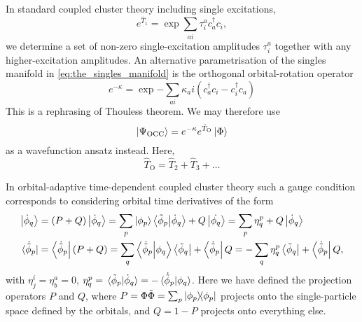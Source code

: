 \begin{tcolorbox}[title={Orbital-optimised and Bruecker coupled cluster theories
    \cite{krylov1998size,pedersen1999gauge}}, 
    colback={white},
    colbacktitle={pink},
    coltitle={black}]

    In standard coupled cluster theory including single excitations,
    \begin{equation}
        \label{eq:the_singles_manifold}
        e^{\hat{T}_1} = \exp{\sum_{ai}\tau^a_ic^\dagger_ac_i},
    \end{equation} 
    we determine a set of non-zero single-excitation amplitudes $\tau^a_i$
    together with any 
    higher-excitation amplitudes.
    An alternative parametrisation of the singles manifold
    in \autoref{eq:the_singles_manifold} is the orthogonal orbital-rotation 
    operator
    \begin{equation}
        \label{eq:the_orbital rotator}
        e^{-\kappa} = \exp{ 
            - \sum_{ai} \kappa_ai(c^\dagger_a c_i - c^\dagger_i c_a)     
        }
    \end{equation}
    This is a rephrasing of Thouless
    theorem\cite{thouless1960stability}. We may therefore use 
    \begin{equation}
       \ket{\Psi_{\text{OCC}}} = e^{-\kappa}e^{\hat{T}_{\text{O}}}\ket{\Phi}
    \end{equation}
    as a wavefunction ansatz instead. Here,
    \begin{equation}
        \hat{T}_{\text{O}} = \hat{T}_2 + \hat{T}_3 + \dots
    \end{equation}

\end{tcolorbox}

In orbital-adaptive time-dependent coupled cluster theory such a gauge condition corresponds
to considering orbital time derivatives of the form
\begin{align}
    \label{eq:orbital_time_derivative_ket}
    \ket{\dot{\phi}_q} &= (P + Q)\ket{\dot{\phi}_q}
        = \sum_p \ket{\phi_p}\braket{\tilde{\phi}_p}{\dot{\phi}_q} 
            + Q\ket{\dot{\phi_q}}
        = \sum_p\eta^p_q + Q\ket{\dot{\phi}_q}\\
    \label{eq:orbital_time_derivative_bra}
    \bra*{\dot{\tilde{\phi}}_p} &= \bra{\dot{\tilde{\phi}}_p}(P + Q)
        = \sum_q \braket{\dot{\tilde{\phi}}_p}{\phi_q}\bra{\tilde{\phi}_q}
            + \bra{\dot{\tilde{\phi}}_p}Q
        = - \sum_q \eta^p_q \bra{\tilde{\phi}_q} + \bra{\dot{\tilde{\phi}}_p}Q,
\end{align}
with $\eta^i_j = \eta^a_b = 0$,
$\eta^p_q = \braket*{\tilde{\phi}_p}{\dot{\phi}_q} = - \braket*{\dot{\tilde{\phi}}_p}{\phi_q}$.
Here we have defined the projection operators $P$ and $Q$, where 
$P = \Phi\tilde{\Phi} = \sum_p \dyad{\phi_p}{\phi_p}$ projects onto the single-particle 
space defined by the orbitals, and $Q = 1 - P$ projects onto everything else.

